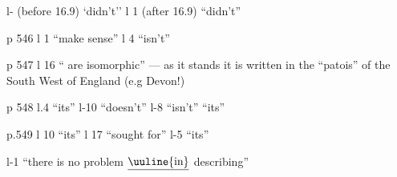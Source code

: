 l- (before 16.9) `didn't'' \quad l 1 (after 16.9) ``didn't''

p 546 l 1 ``make sense'' \quad l 4 ``isn't''

p 547 l 16 `` are isomorphic'' --- as it stands it is written\unsure{:} in the ``patois'' of the South West of England (e.g Devon!)

p 548 l.4 ``its'' \quad l-10 ``doesn't'' \quad l-8 ``isn't'' ``its''

p.549 l 10 ``its'' \quad l 17 ``sought for'' \quad {} \quad l-5 ``its''

l-1 ``there is no problem $\underline{\text{\uuline{in}}}$ describing''
